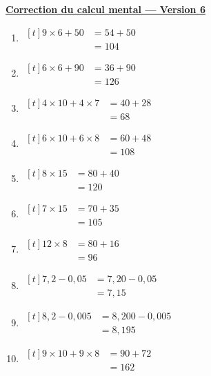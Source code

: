 \documentclass[12pt,a4paper]{article}
\newcommand{\titreversion}[1]{%
  \begin{center}%
    {\Large\underline{\textbf{#1}}}%
  \end{center}%
}
\begin{document}
\titreversion{Correction du calcul mental --- Version 6}
\begin{enumerate}
\item {$\begin{aligned}[t]
9\times 6+50 &= 54+50\\
             &= \boxed{104}
\end{aligned}$}
\item {$\begin{aligned}[t]
6\times 6+90 &= 36+90\\
             &= \boxed{126}
\end{aligned}$}
\item {$\begin{aligned}[t]
4\times 10+4\times 7 &= 40+28\\
                     &= \boxed{68}
\end{aligned}$}
\item {$\begin{aligned}[t]
6\times 10+6\times 8 &= 60+48\\
                     &= \boxed{108}
\end{aligned}$}
\item {$\begin{aligned}[t]
8\times 15 &= 80+40\\
           &= \boxed{120}
\end{aligned}$}
\item {$\begin{aligned}[t]
7\times 15 &= 70+35\\
           &= \boxed{105}
\end{aligned}$}
\item {$\begin{aligned}[t]
12\times 8 &= 80+16\\
           &= \boxed{96}
\end{aligned}$}
\item {$\begin{aligned}[t]
7{,}2-0{,}05 &= 7{,}20-0{,}05\\
             &= \boxed{7{,}15}
\end{aligned}$}
\item {$\begin{aligned}[t]
8{,}2-0{,}005 &= 8{,}200-0{,}005\\
              &= \boxed{8{,}195}
\end{aligned}$}
\item {$\begin{aligned}[t]
9\times 10+9\times 8 &= 90+72\\
                     &= \boxed{162}
\end{aligned}$}
\end{enumerate}
\newpage
\end{document}
